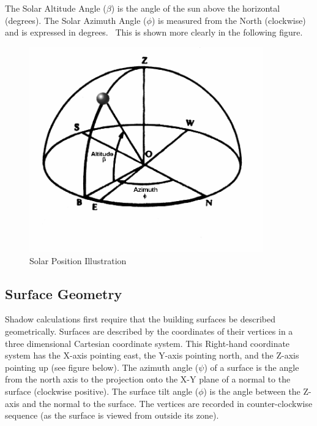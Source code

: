 The Solar Altitude Angle ($\beta$) is the angle of the sun above the horizontal (degrees). The Solar Azimuth Angle ($\phi$) is measured from the North (clockwise) and is expressed in degrees.~ This is shown more clearly in the following figure.

\begin{figure}[hbtp] %
\centering
\includegraphics[width=0.9\textwidth, height=0.9\textheight, keepaspectratio=true]{media/image604.png}
\caption{Solar Position Illustration \protect \label{fig:solar-position-illustration}}
\end{figure}

\subsection{Surface Geometry}\label{surface-geometry}

Shadow calculations first require that the building surfaces be described geometrically. Surfaces are described by the coordinates of their vertices in a three dimensional Cartesian coordinate system. This Right-hand coordinate system has the X-axis pointing east, the Y-axis pointing north, and the Z-axis pointing up (see figure below). The azimuth angle ($\psi$) of a surface is the angle from the north axis to the projection onto the X-Y plane of a normal to the surface (clockwise positive). The surface tilt angle ($\phi$) is the angle between the Z-axis and the normal to the surface. The vertices are recorded in counter-clockwise sequence (as the surface is viewed from outside its zone).

